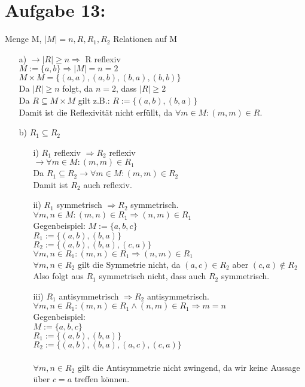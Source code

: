 \documentclass[paper = a4, ngerman]{scrartcl}
\begin{document}
\section*{Aufgabe 13:}

Menge M, $|M| = n, R, R_1, R_2 $ Relationen auf M\\

\begin{itemize}
	\item[a)]
		$\rightarrow |R| \ge n \Rightarrow $ R reflexiv\\
		$M := \{a,b\} \Rightarrow |M| = n = 2$\\
		$M \times M = \{(a,a),(a,b),(b,a),(b,b)\}$\\
		Da $|R| \ge n$ folgt, da $n = 2$, dass $|R| \ge 2$\\
		Da $R \subseteq M \times M$ gilt z.B.: $R := \{(a,b),(b,a)\}$\\
		Damit ist die Reflexivität nicht erfüllt, da $\forall m \in M : (m,m) \in R$.\\
	\item[b)]
		$R_1 \subseteq R_2$
		\begin{itemize}
			\item[i)]
				$R_1$ reflexiv $\Rightarrow R_2 $ reflexiv\\
				$\rightarrow \forall m \in M : (m,m) \in R_1$\\ Da $R_1 \subseteq R_2 \rightarrow \forall m \in M : (m,m) \in R_2$\\ Damit ist $R_2$ auch reflexiv.
			\item[ii)]
				$R_1 $ symmetrisch $\Rightarrow R_2 $ symmetrisch.\\
				$\forall m,n \in M : (m,n) \in R_1 \Rightarrow (n,m) \in R_1$\\
				Gegenbeispiel: $M := \{a,b,c\}$\\
				$R_1 := \{(a,b),(b,a)\}$\\
				$R_2 := \{(a,b),(b,a),(c,a)\}$\\
				$\forall m,n \in R_1 : (m,n) \in R_1 \Rightarrow (n,m) \in R_1$\\
				$\forall m,n \in R_2 $ gilt die Symmetrie nicht, da $(a,c) \in R_2$ aber $(c,a) \notin R_2 $\\
				
				Also folgt aus 	$R_1 $ symmetrisch nicht, dass auch $R_2$ symmetrisch.
\pagebreak
			\item[iii)]
				$R_1$ antisymmetrisch $\Rightarrow R_2$ antisymmetrisch.\\
				$\forall m,n \in R_1 : (m,n) \in R_1 \wedge (n,m) \in R_1 \Rightarrow m = n$\\
				Gegenbeispiel:\\
				$M := \{a,b,c\}$\\
				$R_1 := \{(a,b),(b,a)\}$\\
				$R_2 := \{(a,b),(b,a),(a,c),(c,a)\}$\\\\
				$\forall m,n \in R_2 $ gilt die Antisymmetrie nicht zwingend, da wir keine Aussage über $ c = a $ treffen können.\\
				

\end{itemize}
\end{itemize}
\end{document}
